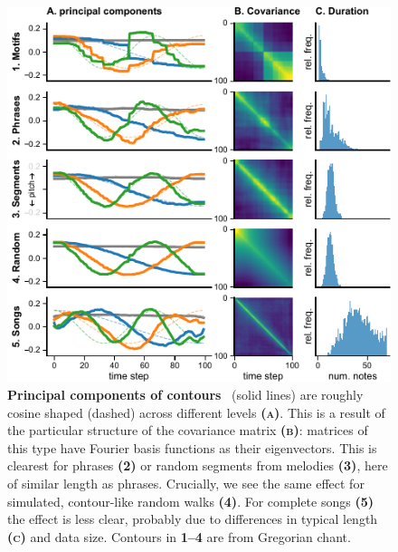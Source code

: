 \documentclass{article}
\newcommand{\subfiglabel}[1]{\textbf{\textsc{#1}}}
\begin{document}
\begin{figure}[t]
    \centering
    \includegraphics{figs/fig02-pca.pdf}
    \caption{%
        \textbf{Principal components of contours}~%
        (solid lines) are roughly cosine shaped (dashed) across different levels \textsc{\textbf{(a)}}.
        This is a result of the particular structure of the covariance matrix \textsc{\textbf{(b)}}: matrices of this type have Fourier basis functions as their eigenvectors.
        This is clearest for phrases \textsc{\textbf{(2)}} or random segments from melodies \textsc{\textbf{(3)}}, here of similar length as phrases.
        Crucially, we see the same effect for simulated, contour-like random walks \textsc{\textbf{(4)}}.
        For complete songs \subfiglabel{(5)} the effect is less clear, probably due to differences in typical length \textsc{\textbf{(c)}} and data size.
        Contours in \subfiglabel{1--4} are from Gregorian chant.
    }
    \label{fig:pca}
\end{figure}
\end{document}
